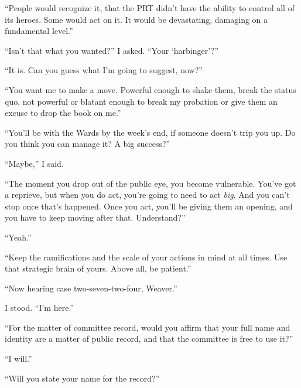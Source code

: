 ``People would recognize it, that the PRT didn't have the ability to control all of its heroes.  Some would act on it.  It would be devastating, damaging on a fundamental level.''



``Isn't that what you wanted?'' I asked.  ``Your `harbinger'?''



``It is.  Can you guess what I'm going to suggest, now?''



``You want me to make a move.  Powerful enough to shake them, break the status quo, not powerful or blatant enough to break my probation or give them an excuse to drop the book on me.''



``You'll be with the Wards by the week's end, if someone doesn't trip you up.  Do you think you can manage it?  A big success?''



``Maybe,'' I said.



``The moment you drop out of the public eye, you become vulnerable.  You've got a reprieve, but when you do act, you're going to need to act \emph{big}.  And you can't stop once that's happened.  Once you act, you'll be giving them an opening, and you have to keep moving after that.  Understand?''



``Yeah.''



``Keep the ramifications and the scale of your actions in mind at all times.  Use that strategic brain of yours.  Above all, be patient.''



\blacksquare



``Now hearing case two-seven-two-four, Weaver.''



I stood.  ``I'm here.''



``For the matter of committee record, would you affirm that your full name and identity are a matter of public record, and that the committee is free to use it?''



``I will.''



``Will you state your name for the record?''



